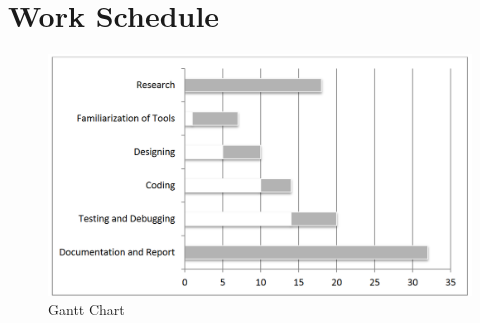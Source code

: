 \section{Work Schedule}
\begin{figure}[tbh] %
\begin{center}
	\includegraphics[width=5in]{images/gantt.png}
	\caption{Gantt Chart} %
	\label{Gantt chart} %
\end{center}
\end{figure}
\newpage



\renewcommand\bibname{References} %



